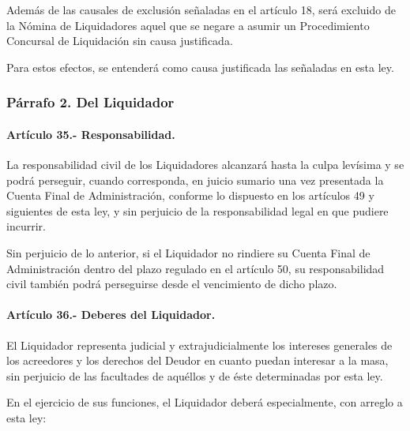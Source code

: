 \documentclass[
]{book}
\begin{document}
Además de las causales de exclusión señaladas en el artículo 18, será excluido de la Nómina de Liquidadores aquel que se negare a asumir un Procedimiento Concursal de Liquidación sin causa justificada.

Para estos efectos, se entenderá como causa justificada las señaladas en esta ley.

\hypertarget{puxe1rrafo-2.-del-liquidador}{%
\subsubsection*{Párrafo 2. Del Liquidador}\label{puxe1rrafo-2.-del-liquidador}}

\hypertarget{artuxedculo-35.--responsabilidad.}{%
\paragraph*{Artículo 35.- Responsabilidad.}\label{artuxedculo-35.--responsabilidad.}}

La responsabilidad civil de los Liquidadores alcanzará hasta la culpa levísima y se podrá perseguir, cuando corresponda, en juicio sumario una vez presentada la Cuenta Final de Administración, conforme lo dispuesto en los artículos 49 y siguientes de esta ley, y sin perjuicio de la responsabilidad legal en que pudiere incurrir.

Sin perjuicio de lo anterior, si el Liquidador no rindiere su Cuenta Final de Administración dentro del plazo regulado en el artículo 50, su responsabilidad civil también podrá perseguirse desde el vencimiento de dicho plazo.

\hypertarget{artuxedculo-36.--deberes-del-liquidador.}{%
\paragraph*{Artículo 36.- Deberes del Liquidador.}\label{artuxedculo-36.--deberes-del-liquidador.}}

El Liquidador representa judicial y extrajudicialmente los intereses generales de los acreedores y los derechos del Deudor en cuanto puedan interesar a la masa, sin perjuicio de las facultades de aquéllos y de éste determinadas por esta ley.

En el ejercicio de sus funciones, el Liquidador deberá especialmente, con arreglo a esta ley:
\end{document}
